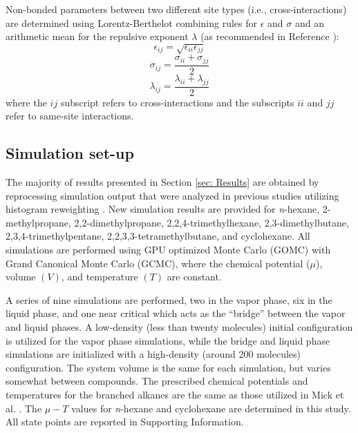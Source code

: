 \documentclass[journal=jced,manuscript=article]{achemso}
\begin{document}
    Non-bonded parameters between two different site types (i.e., cross-interactions) are determined using Lorentz-Berthelot combining rules \cite{Allen1987} for $\epsilon$ and $\sigma$ and an arithmetic mean for the repulsive exponent $\lambda$ (as recommended in Reference ):
    \begin{equation} \label{eq:Lorentz-Berthelot_eps}
    \epsilon_{ij} = \sqrt{\epsilon_{ii} \epsilon_{jj}}
    \end{equation}
    \begin{equation} \label{eq:Lorentz-Berthelot_sig}
    \sigma_{ij} = \frac{\sigma_{ii} + \sigma_{jj}}{2}
    \end{equation}
    \begin{equation} \label{eq:Lorentz-Berthelot_lam}
    \lambda_{ij} = \frac{\lambda_{ii} + \lambda_{jj}}{2}
    \end{equation}
    where the $ij$ subscript refers to cross-interactions and the subscripts $ii$ and $jj$ refer to same-site interactions. 
    

\subsection{Simulation set-up} \label{sec: Simulation set-up}

The majority of results presented in Section \ref{sec: Results} are obtained by reprocessing simulation output that were analyzed in previous studies utilizing histogram reweighting \cite{Potoff_branched,Barhaghi2017}. New simulation results are provided for \textit{n}-hexane, 2-methylpropane, 2,2-dimethylpropane, 2,2,4-trimethylhexane, 2,3-dimethylbutane, 2,3,4-trimethylpentane, 2,2,3,3-tetramethylbutane, and cyclohexane. All simulations are performed using GPU optimized Monte Carlo (GOMC) with Grand Canonical Monte Carlo (GCMC), where the chemical potential ($\mu$), volume $(V)$, and temperature $(T)$ are constant. 

A series of nine simulations are performed, two in the vapor phase, six in the liquid phase, and one near critical which acts as the ``bridge'' between the vapor and liquid phases. A low-density (less than twenty molecules) initial configuration is utilized for the vapor phase simulations, while the bridge and liquid phase simulations are initialized with a high-density (around 200 molecules) configuration. The system volume is the same for each simulation, but varies somewhat between compounds. The prescribed chemical potentials and temperatures for the branched alkanes are the same as those utilized in Mick et al. \cite{Potoff_branched}. The $\mu-T$ values for \textit{n}-hexane and cyclohexane are determined in this study. All state points are reported in Supporting Information. 
\end{document}

